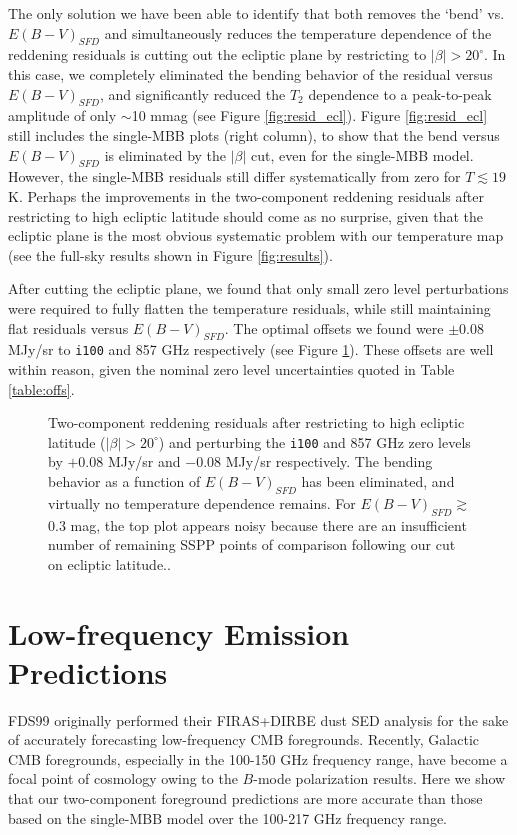 \documentclass{emulateapj}
\begin{document}
The only solution we have been able to identify that both removes the `bend' 
vs. $E(B-V)_{SFD}$ and simultaneously reduces the temperature dependence of the
reddening residuals is cutting out the ecliptic plane by restricting to 
$|\beta|>20^{\circ}$. In this case, we completely eliminated the bending 
behavior of the residual versus $E(B-V)_{SFD}$, and significantly reduced the 
$T_2$ dependence to a peak-to-peak amplitude of only $\sim$10 mmag (see Figure 
\ref{fig:resid_ecl}). Figure \ref{fig:resid_ecl} still includes the single-MBB 
plots (right column), to show that the bend versus $E(B-V)_{SFD}$ is eliminated
by the $|\beta|$ cut, even for the single-MBB model. However, the single-MBB 
residuals still differ systematically from zero for $T$$\lesssim$$19$ K. 
Perhaps the improvements in the two-component reddening residuals after 
restricting to high ecliptic latitude should come as no surprise, given that 
the ecliptic plane is the most obvious systematic problem with our temperature 
map (see the full-sky results shown in Figure \ref{fig:results}).

After cutting the ecliptic plane, we found that only small zero level
perturbations were required to fully flatten the temperature residuals, while 
still maintaining flat residuals versus $E(B-V)_{SFD}$. The optimal offsets we 
found were $\pm$0.08 MJy/sr to \verb|i100| and 857 GHz respectively (see Figure
\ref{fig:resid_offs}). These offsets are well within reason, given the nominal 
zero level uncertainties quoted in Table \ref{table:offs}.

\begin{figure}
\begin{center}
\caption{\label{fig:resid_offs} Two-component reddening residuals after 
restricting to high ecliptic latitude ($|\beta|>20^{\circ}$) and perturbing the
\texttt{i100} and 857 GHz zero levels by $+$0.08 MJy/sr and $-$0.08 MJy/sr 
respectively. The bending behavior as a function of $E(B-V)_{SFD}$ has been
eliminated, and virtually no temperature dependence remains. For 
$E(B-V)_{SFD}$$\gtrsim$0.3 mag, the top plot appears noisy because there are an
insufficient number of remaining SSPP points of comparison following our cut on
ecliptic latitude..}
\end{center}
\end{figure}

\section{Low-frequency Emission Predictions}
\label{sec:lofreq}
FDS99 originally performed their FIRAS+DIRBE dust SED analysis for the sake of
accurately forecasting low-frequency CMB foregrounds. Recently, Galactic CMB
foregrounds, especially in the 100-150 GHz frequency range, have become a focal
point of cosmology owing to the \cite{bicep2} $B$-mode polarization results. 
Here we show that our two-component foreground predictions are more accurate 
than those based on the \cite{planckdust} single-MBB model over the 100-217 GHz
frequency range.
\end{document}
